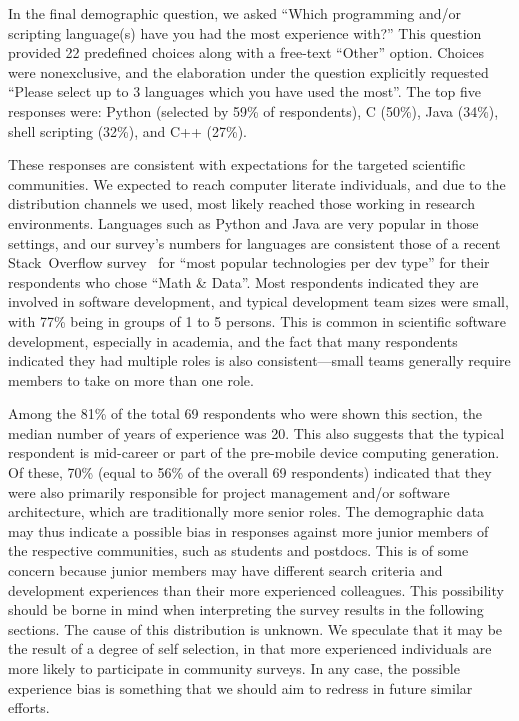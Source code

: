 \documentclass{casicswhitepaper}
\newcommand{\totalRespondents}{69\xspace}
\begin{document}
In the final demographic question, we asked ``Which programming and/or scripting language(s) have you had the most experience with?''  This question provided 22 predefined choices along with a free-text ``Other'' option.  Choices were nonexclusive, and the elaboration under the question explicitly requested ``Please select up to 3 languages which you have used the most''.   The top five responses were: Python (selected by 59\% of respondents), C (50\%), Java (34\%), shell scripting (32\%), and C++ (27\%).

These responses are consistent with expectations for the targeted scientific communities.  We expected to reach computer literate individuals, and due to the distribution channels we used, most likely reached those working in research environments.  Languages such as Python and Java are very popular in those settings, and our survey's numbers for languages are consistent those of a recent Stack~Overflow survey~\cite{stackexchange2016survey} for ``most popular technologies per dev type'' for their respondents who chose ``Math \& Data''.  Most respondents indicated they are involved in software development, and typical development team sizes were small, with 77\% being in groups of 1 to 5 persons.  This is common in scientific software development, especially in academia, and the fact that many respondents indicated they had multiple roles is also consistent---small teams generally require members to take on more than one role.


Among the 81\% of the total \totalRespondents respondents who were shown this section, the median number of years of experience was 20. This also suggests that the typical respondent is mid-career or part of the pre-mobile device computing generation.  Of these, 70\% (equal to 56\% of the overall \totalRespondents respondents) indicated that they were also primarily responsible for project management and/or software architecture, which are traditionally more senior roles.  The demographic data may thus indicate a possible bias in responses against more junior members of the respective communities, such as students and postdocs.  This is of some concern because junior members may have different search criteria and development experiences than their more experienced colleagues. This possibility should be borne in mind when interpreting the survey results in the following sections. The cause of this distribution is unknown.  We speculate that it may be the result of a degree of self selection, in that more experienced individuals are more likely to participate in community surveys.  In any case, the possible experience bias is something that we should aim to redress in future similar efforts.
\end{document}
